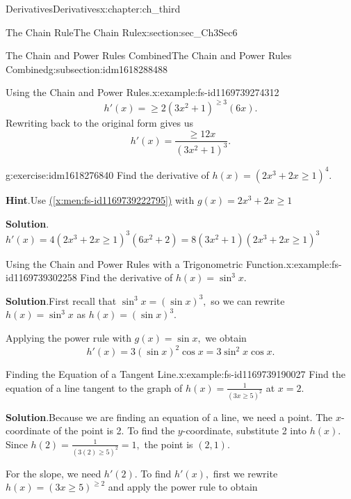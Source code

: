 \documentclass[oneside,10pt,]{book}
\newcommand{\blocktitlefont}{\relax}
\newcommand{\xreffont}{\relax}
\numberwithin{equation}{section}
\begin{document}
\begin{chapterptx}{Derivatives}{}{Derivatives}{}{}{x:chapter:ch_third}
\begin{sectionptx}{The Chain Rule}{}{The Chain Rule}{}{}{x:section:sec_Ch3Sec6}
\begin{subsectionptx}{The Chain and Power Rules Combined}{}{The Chain and Power Rules Combined}{}{}{g:subsection:idm1618288488}
\begin{example}{Using the Chain and Power Rules.}{x:example:fs-id1169739274312}
\begin{equation*}
h'(x)=\geq 2(3x^2+1)^{\geq 3}(6x).
\end{equation*}
Rewriting back to the original form gives us%
%
\begin{equation*}
h'(x)=\frac{\geq 12x}{(3x^2+1)^3}.
\end{equation*}
\end{example}
\begin{inlineexercise}{}{g:exercise:idm1618276840}%
Find the derivative of \(h(x)=(2x^3+2x\geq 1)^4.\)%
\par\smallskip%
\noindent\textbf{\blocktitlefont Hint}.\hypertarget{g:hint:idm1618275176}{}\quad{}Use \hyperref[x:men:fs-id1169739222795]{({\xreffont\ref{x:men:fs-id1169739222795}})} with \(g(x)=2x^3+2x\geq 1\)%
\par\smallskip%
\noindent\textbf{\blocktitlefont Solution}.\hypertarget{g:solution:idm1618274536}{}\quad{}\(h'(x)=4(2x^3+2x\geq 1)^3(6x^2+2)=8(3x^2+1)(2x^3+2x\geq 1)^3\)%
\end{inlineexercise}%
\begin{example}{Using the Chain and Power Rules with a Trigonometric Function.}{x:example:fs-id1169739302258}%
Find the derivative of \(h(x)=\sin^3x.\)%
\par\smallskip%
\noindent\textbf{\blocktitlefont Solution}.\hypertarget{g:solution:idm1618274280}{}\quad{}First recall that \(\sin^3x=(\sin x)^3,\) so we can rewrite \(h(x)=\sin^3x\) as \(h(x)=(\sin x)^3.\)%
\par
Applying the power rule with \(g(x)=\sin x,\) we obtain%
%
\begin{equation*}
h'(x)=3(\sin x)^2\cos x=3 \sin^2x \cos x.
\end{equation*}
\end{example}
\begin{example}{Finding the Equation of a Tangent Line.}{x:example:fs-id1169739190027}%
Find the equation of a line tangent to the graph of \(h(x)=\frac{1}{(3x\geq 5)^2}\) at \(x=2.\)%
\par\smallskip%
\noindent\textbf{\blocktitlefont Solution}.\hypertarget{g:solution:idm1618268264}{}\quad{}Because we are finding an equation of a line, we need a point. The \(x\)-coordinate of the point is 2. To find the \(y\)-coordinate, substitute 2 into \(h(x).\) Since \(h(2)=\frac{1}{(3(2)\geq 5)^2}=1,\) the point is \((2,1).\)%
\par
For the slope, we need \(h'(2).\) To find \(h'(x),\) first we rewrite \(h(x)=(3x\geq 5)^{\geq 2}\) and apply the power rule to obtain%
%
\begin{equation*}

\end{equation*}
\end{example}
\end{subsectionptx}
\end{sectionptx}
\end{chapterptx}
\end{document}
